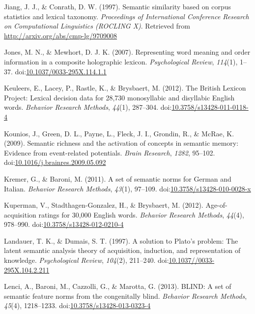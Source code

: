 \documentclass[english,,man]{apa6}
\theoremstyle{definition}
\theoremstyle{definition}
\theoremstyle{definition}
\theoremstyle{remark}
\begin{document}
\leavevmode\hypertarget{ref-Jiang1997}{}%
Jiang, J. J., \& Conrath, D. W. (1997). Semantic similarity based on
corpus statistics and lexical taxonomy. \emph{Proceedings of
International Conference Research on Computational Linguistics (ROCLING
X)}. Retrieved from \url{http://arxiv.org/abs/cmp-lg/9709008}

\leavevmode\hypertarget{ref-Jones2007}{}%
Jones, M. N., \& Mewhort, D. J. K. (2007). Representing word meaning and
order information in a composite holographic lexicon.
\emph{Psychological Review}, \emph{114}(1), 1--37.
doi:\href{https://doi.org/10.1037/0033-295X.114.1.1}{10.1037/0033-295X.114.1.1}

\leavevmode\hypertarget{ref-Keuleers2012}{}%
Keuleers, E., Lacey, P., Rastle, K., \& Brysbaert, M. (2012). The
British Lexicon Project: Lexical decision data for 28,730 monosyllabic
and disyllabic English words. \emph{Behavior Research Methods},
\emph{44}(1), 287--304.
doi:\href{https://doi.org/10.3758/s13428-011-0118-4}{10.3758/s13428-011-0118-4}

\leavevmode\hypertarget{ref-Kounios2009}{}%
Kounios, J., Green, D. L., Payne, L., Fleck, J. I., Grondin, R., \&
McRae, K. (2009). Semantic richness and the activation of concepts in
semantic memory: Evidence from event-related potentials. \emph{Brain
Research}, \emph{1282}, 95--102.
doi:\href{https://doi.org/10.1016/j.brainres.2009.05.092}{10.1016/j.brainres.2009.05.092}

\leavevmode\hypertarget{ref-Kremer2011a}{}%
Kremer, G., \& Baroni, M. (2011). A set of semantic norms for German and
Italian. \emph{Behavior Research Methods}, \emph{43}(1), 97--109.
doi:\href{https://doi.org/10.3758/s13428-010-0028-x}{10.3758/s13428-010-0028-x}

\leavevmode\hypertarget{ref-Kuperman2012}{}%
Kuperman, V., Stadthagen-Gonzalez, H., \& Brysbaert, M. (2012).
Age-of-acquisition ratings for 30,000 English words. \emph{Behavior
Research Methods}, \emph{44}(4), 978--990.
doi:\href{https://doi.org/10.3758/s13428-012-0210-4}{10.3758/s13428-012-0210-4}

\leavevmode\hypertarget{ref-Landauer1997}{}%
Landauer, T. K., \& Dumais, S. T. (1997). A solution to Plato's problem:
The latent semantic analysis theory of acquisition, induction, and
representation of knowledge. \emph{Psychological Review}, \emph{104}(2),
211--240.
doi:\href{https://doi.org/10.1037//0033-295X.104.2.211}{10.1037//0033-295X.104.2.211}

\leavevmode\hypertarget{ref-Lenci2013}{}%
Lenci, A., Baroni, M., Cazzolli, G., \& Marotta, G. (2013). BLIND: A set
of semantic feature norms from the congenitally blind. \emph{Behavior
Research Methods}, \emph{45}(4), 1218--1233.
doi:\href{https://doi.org/10.3758/s13428-013-0323-4}{10.3758/s13428-013-0323-4}
\end{document}
